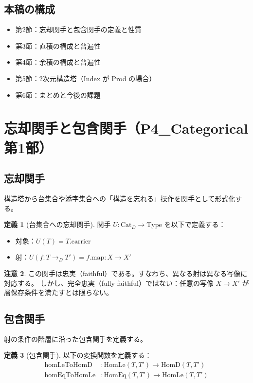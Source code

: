 \documentclass[a4paper,11pt]{ltjsarticle}
\theoremstyle{definition}
\newtheorem{definition}{定義}[section]
\newtheorem{remark}[definition]{注意}
\begin{document}
\subsection{本稿の構成}

\begin{itemize}
  \item 第2節：忘却関手と包含関手の定義と性質
  \item 第3節：直積の構成と普遍性
  \item 第4節：余積の構成と普遍性
  \item 第5節：2次元構造塔（Index が Prod の場合）
  \item 第6節：まとめと今後の課題
\end{itemize}

\section{忘却関手と包含関手（P4\_Categorical 第1部）}

\subsection{忘却関手}

構造塔から台集合や添字集合への「構造を忘れる」操作を関手として形式化する。

\begin{definition}[台集合への忘却関手]
関手 $U : \mathrm{Cat}_D \to \mathrm{Type}$ を以下で定義する：
\begin{itemize}
  \item 対象：$U(T) = T.\mathrm{carrier}$
  \item 射：$U(f : T \to_{D} T') = f.\mathrm{map} : X \to X'$
\end{itemize}
\end{definition}

\begin{remark}
この関手は忠実（faithful）である。すなわち、異なる射は異なる写像に対応する。
しかし、完全忠実（fully faithful）ではない：任意の写像 $X \to X'$ が層保存条件を満たすとは限らない。
\end{remark}

\subsection{包含関手}

射の条件の階層に沿った包含関手を定義する。

\begin{definition}[包含関手]
以下の変換関数を定義する：
\begin{align*}
  \mathrm{homLeToHomD} &: \mathrm{HomLe}(T, T') \to \mathrm{HomD}(T, T') \\
  \mathrm{homEqToHomLe} &: \mathrm{HomEq}(T, T') \to \mathrm{HomLe}(T, T')
\end{align*}
\end{definition}
\end{document}
